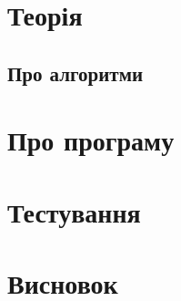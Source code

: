 \section{Теорія}
\subsection{Про алгоритми}

\section{Про програму}

\section{Тестування}

\section{Висновок}